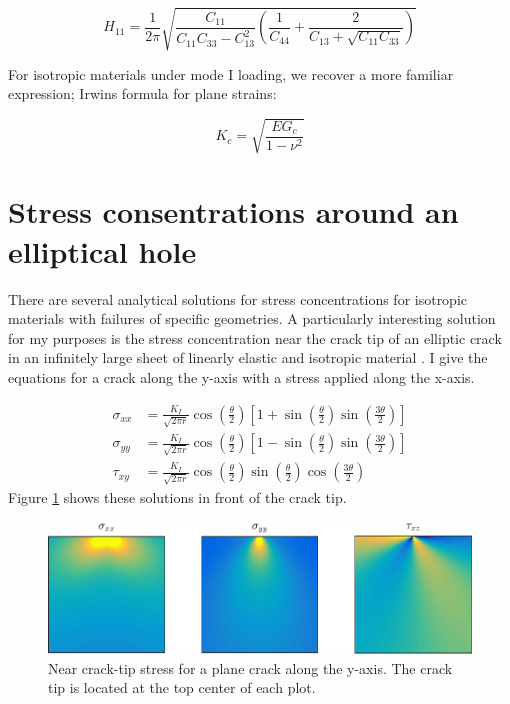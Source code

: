 \begin{equation}
	H_{11} = \frac{1}{2\pi} \sqrt{\frac{C_{11}}{C_{11}C_{33}-C^2_{13}}\left( \frac{1}{C_{44}} + \frac{2}{C_{13} + \sqrt{C_{11} C_{33}}}\right)}
\end{equation}

For isotropic materials under mode I loading, we recover a more familiar expression; Irwins formula for plane strains:

\begin{equation}
	K_c = \sqrt{\frac{EG_c}{1-\nu^2}}
	\label{eq:energy_release_to_stress_intensity_isotropic}
\end{equation}

\section{Stress consentrations around an elliptical hole}
There are several analytical solutions for stress concentrations for isotropic materials with failures of specific geometries. A particularly interesting solution for my purposes is the stress concentration near the crack tip of an elliptic crack in an infinitely large sheet of linearly elastic and isotropic material \cite{Anderson2005}. I give the equations for a crack along the y-axis with a stress applied along the x-axis.

\begin{align}
	\sigma_{xx} & =  \frac{K_I}{\sqrt{2\pi r}} \cos\left(\frac{\theta}{2}\right) \left[ 1+\sin\left(\frac{\theta}{2} \right)\sin\left( \frac{3\theta}{2}\right)\right]\\
	\sigma_{yy} & =  \frac{K_I}{\sqrt{2\pi r}} \cos\left(\frac{\theta}{2}\right) \left[ 1-\sin\left(\frac{\theta}{2} \right)\sin\left( \frac{3\theta}{2}\right)\right]\\	
	\tau_{xy} & =  \frac{K_I}{\sqrt{2\pi r}} \cos\left(\frac{\theta}{2}\right)\sin\left(\frac{\theta}{2} \right)\cos\left( \frac{3\theta}{2}\right)
\end{align}
Figure \ref{fig:analytic_stress} shows these solutions in front of the crack tip.

\begin{figure}
\centering
\includegraphics[width=\textwidth]{../figures/thesis/analytic_stress.pdf}
\caption{Near crack-tip stress for a plane crack along the y-axis. The crack tip is located at the top center of each plot.}
\label{fig:analytic_stress}
\end{figure}

